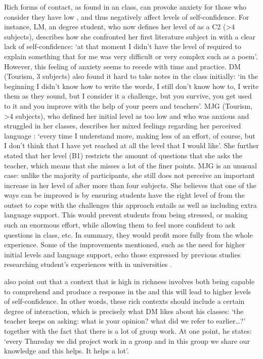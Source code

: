 \documentclass[output=paper]{langsci/langscibook}
\begin{document}
\newpage 
Rich forms of contact, as found in an  class, can provoke anxiety for those who consider they have low , and thus negatively affect levels of self-confidence.  For instance, LM, an  degree student, who now defines her level of  as a C2 (>4  subjects), describes how she confronted her first literature subject in  with a clear lack of self-confidence: ‘at that moment I didn’t have the level of  required to explain something that for me was very difficult or very complex such as a poem’. However, this feeling of anxiety seems to recede with time and practice.  DM (Tourism, 3  subjects) also found it hard to take notes in the  class initially: ‘in the beginning I didn’t know how to write the words, I still don’t know how to, I write them as they sound, but I consider it a challenge, but you survive, you get used to it and you improve with the help of your peers and teachers’. MJG (Tourism, >4  subjects), who defined her initial level as too low and who was anxious and struggled in her classes, describes her mixed feelings regarding her perceived language : ‘every time I understand more, making less of an effort, of course, but I don’t think that I have yet reached at all the level that I would like’. She further stated that her  level (B1) restricts the amount of questions that she asks the teacher, which means that she misses a lot of the finer points.  MJG is an unusual case:  unlike the majority of participants, she still does not perceive an important increase in her level of  after more than four  subjects. She believes that one of the ways  can be improved is by ensuring students have the right level of  from the outset to cope with the challenges this approach entails as well as including extra  language support. This would prevent students from being stressed, or making such an enormous effort, while allowing them to feel more confident to ask questions in class, etc. In summary, they would profit more fully from the whole experience.  Some of  the improvements mentioned, such as  the need for higher initial   levels and language support,  echo those expressed by previous studies researching student’s experiences with  in  universities \citep{AguilarRodríguez2012,Arnó-MaciàMancho-Barés2015}.


\largerpage
\citet{SampasivamClément2014} also point out that a context that is high in richness involves both being capable to comprehend and produce a response in the  and this will lead to higher levels of self-confidence. In other words, these rich contexts should include a certain degree of interaction, which is precisely what DM likes about his  classes: ‘the teacher keeps on asking: what is your opinion? what did we refer to earlier…?’ together with the fact that there is a lot of group work. At one point, he states: ‘every Thursday we did project work in a group and in this group we share our  knowledge and this helps. It helps a lot’. 
\end{document}
